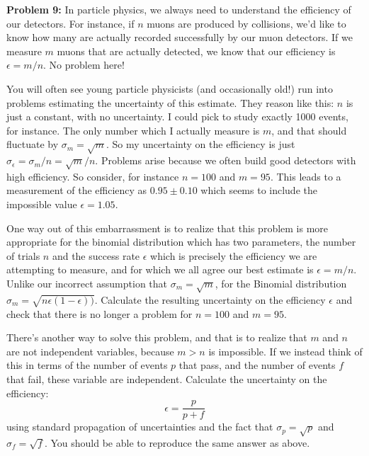 \documentclass[12pt]{article}
\begin{document}
\noindent
{\bf Problem 9:}  In particle physics, we always need to understand the efficiency of our detectors.  For instance, if $n$ muons are produced by collisions, we'd like to know how many are actually recorded successfully by our muon detectors.  If we measure $m$ muons that are actually detected, we know that our efficiency is $\epsilon = m/n$.  No problem here!

You will often see young particle physicists (and occasionally old!) run into problems estimating the uncertainty of this estimate.  They reason like this:  $n$ is just a constant, with no uncertainty.  I could pick to study exactly 1000 events, for instance.  The only number which I actually measure is $m$, and that should fluctuate by $\sigma_m = \sqrt{m}$.  So my uncertainty on the efficiency is just $\sigma_\epsilon = \sigma_m/n = \sqrt{m}/n$.  Problems arise because we often build good detectors with high efficiency.  So consider, for instance $n=100$ and $m=95$.  This leads to a measurement of the efficiency as $0.95 \pm 0.10$ which seems to include the impossible value $\epsilon = 1.05$.

One way out of this embarrassment is to realize that this problem is more appropriate for the binomial distribution which has two parameters, the number of trials $n$ and the success rate $\epsilon$ which is precisely the efficiency we are attempting to measure, and for which we all agree our best estimate is $\epsilon = m/n$.  Unlike our incorrect assumption that $\sigma_m = \sqrt{m}$, for the Binomial distribution
$\sigma_m = \sqrt{n \epsilon (1 - \epsilon))}$.  Calculate the resulting uncertainty on the efficiency 
$\epsilon$ and check that there is no longer a problem for $n=100$ and $m=95$.

There's another way to solve this problem, and that is to realize that $m$ and $n$ are not independent variables, because $m > n$ is impossible.  If we instead think of this in terms of the number of events $p$ that pass, and the number of events $f$ that fail, these variable are independent.  Calculate the uncertainty on the efficiency: 
\begin{displaymath}
\epsilon = \frac{p}{p+f}
\end{displaymath}
using standard propagation of uncertainties and the fact that $\sigma_p = \sqrt{p}$ and $\sigma_f = \sqrt{f}$.  You should be able to reproduce the same answer as above. \\ \vskip 0.25cm
   
%
\end{document}

